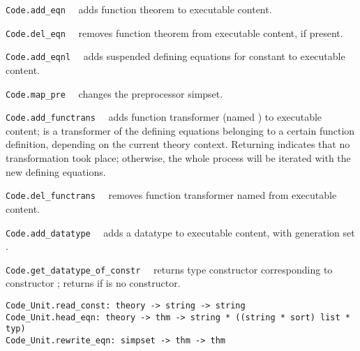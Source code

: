 \begin{isabellebody}
\begin{isamarkuptext}
  \begin{description}

  \item \verb|Code.add_eqn|~~ adds function
     theorem  to executable content.

  \item \verb|Code.del_eqn|~~ removes function
     theorem  from executable content, if present.

  \item \verb|Code.add_eqnl|~~ adds
     suspended defining equations  for constant
      to executable content.

  \item \verb|Code.map_pre|~~ changes
     the preprocessor simpset.

  \item \verb|Code.add_functrans|~~ adds
     function transformer  (named ) to executable content;
      is a transformer of the defining equations belonging
     to a certain function definition, depending on the
     current theory context.  Returning  indicates that no
     transformation took place;  otherwise, the whole process will be iterated
     with the new defining equations.

  \item \verb|Code.del_functrans|~~ removes
     function transformer named  from executable content.

  \item \verb|Code.add_datatype|~~ adds
     a datatype to executable content, with generation
     set .

  \item \verb|Code.get_datatype_of_constr|~~
     returns type constructor corresponding to
     constructor ; returns 
     if  is no constructor.

  \end{description}%
\end{isamarkuptext}%
\isamarkuptrue%
%
\endisatagmlref
{\isafoldmlref}%
%
\isadelimmlref
%
\endisadelimmlref
%
\isamarkuptrue%
%
\isadelimmlref
%
\endisadelimmlref
%
\isatagmlref
%
\begin{isamarkuptext}%
\begin{mldecls}
  \verb|Code_Unit.read_const: theory -> string -> string| \\
  \verb|Code_Unit.head_eqn: theory -> thm -> string * ((string * sort) list * typ)| \\
  \verb|Code_Unit.rewrite_eqn: simpset -> thm -> thm| \\
  \end{mldecls}


\end{isamarkuptext}
\end{isabellebody}

